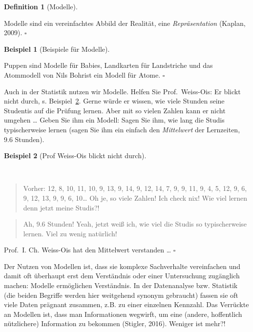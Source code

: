 \documentclass[
  letterpaper,
  oneside,
  open=any]{scrbook}
\theoremstyle{definition}
\theoremstyle{definition}
\newtheorem{example}{Beispiel}[chapter]
\theoremstyle{definition}
\newtheorem{definition}{Definition}[chapter]
\theoremstyle{remark}
\begin{document}
\begin{definition}[Modelle]\protect\hypertarget{def-modelle}{}\label{def-modelle}

Modelle sind ein vereinfachtes Abbild der Realität, eine
\emph{Repräsentation} (Kaplan, 2009). \(\square\)

\end{definition}

\begin{example}[Beispiele für
Modelle]\protect\hypertarget{exm-Modelle}{}\label{exm-Modelle}

Puppen sind Modelle für Babies, Landkarten für Landstriche und das
Atommodell von Nils Bohrist ein Modell für Atome. \(\square\)

\end{example}

Auch in der Statistik nutzen wir Modelle. Helfen Sie Prof.~Weiss-Ois: Er
blickt nicht durch, s. Beispiel~\ref{exm-weiss-ois}. Gerne würde er
wissen, wie viele Stunden seine Studentis auf die Prüfung lernen. Aber
mit so vielen Zahlen kann er nicht umgehen \ldots{} Geben Sie ihm ein
Modell: Sagen Sie ihm, wie lang die Studis typischerweise lernen (sagen
Sie ihm ein einfach den \emph{Mittelwert} der Lernzeiten, 9.6 Stunden).

\begin{example}[Prof Weiss-Ois blickt nicht
durch]\protect\hypertarget{exm-weiss-ois}{}\label{exm-weiss-ois}

~

\begin{quote}
{} Vorher: 12, 8, 10, 11, 10, 9, 13, 9, 14, 9, 12, 14, 7,
9, 9, 11, 9, 4, 5, 12, 9, 6, 9, 12, 13, 9, 9, 6, 10\ldots{} Oh je, so
viele Zahlen! Ich check nix! Wie viel lernen denn jetzt meine Studis?!
\end{quote}

\begin{quote}
{} Ah, 9.6 Stunden! Yeah, jetzt weiß ich, wie viel die
Studis so typischerweise lernen. Viel zu wenig natürlich!
\end{quote}

Prof.~I. Ch. Weiss-Ois hat den Mittelwert verstanden \ldots{}
\(\square\)

\end{example}

Der Nutzen von Modellen ist, dass sie komplexe Sachverhalte vereinfachen
und damit oft überhaupt erst dem Verständnis oder einer Untersuchung
zugänglich machen: Modelle ermöglichen Verständnis. In der Datenanalyse
bzw. Statistik (die beiden Begriffe werden hier weitgehend synonym
gebraucht) fassen sie oft viele Daten prägnant zusammen, z.B. zu einer
einzelnen Kennzahl. Das Verrückte an Modellen ist, dass man
Informationen wegwirft, um eine (andere, hoffentlich nützlichere)
Information zu bekommen (Stigler, 2016). Weniger ist mehr?!
\end{document}

